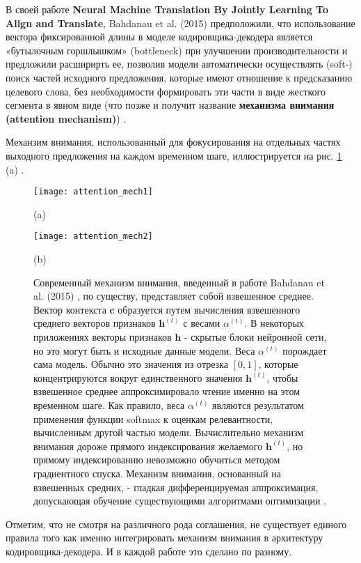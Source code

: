 В своей работе \textbf{Neural Machine Translation By Jointly Learning To 
Align and Translate}, Bahdanau et al. (2015) предположили, 
что использование вектора фиксированной длины в моделе кодировщика-декодера 
является «бутылочным горшлышком» (bottleneck) при улучшении производительности 
и предложили расширирть ее, позволив модели автоматически осуществлять (soft-) 
поиск частей исходного предложения, которые имеют отношение к предсказанию целевого 
слова, без необходимости формировать эти части в виде жесткого сегмента в явном виде 
(что позже и получит название \textbf{механизма внимания (attention mechanism)})
\cite{attention_mech}.

Механзим внимания, использованный для фокусирования на отдельных частях выходного 
предложения на каждом временном шаге, иллюстрируется на рис. \ref{fig:attention_mechs} (a) 
\cite{Goodfellow-et-al-2016}.

\newpage

\begin{figure}[htbp]
    \centering
    \begin{minipage}{0.35\textwidth}
        \texttt{[image: attention\_mech1]}
        \caption*{(a)}
        \label{fig:attention_mech1}
    \end{minipage}
    \hspace{30pt}
    \begin{minipage}{0.55\textwidth}
        \texttt{[image: attention\_mech2]}
        \caption*{(b)}
        \label{fig:attention_mech2}
    \end{minipage}
    \caption{Современный механизм внимания, введенный в работе
    Bahdanau et al. (2015) \cite{attention_mech}, 
    по существу, представляет собой взвешенное
    среднее. Вектор контекста $\bm{c}$ образуется путем вычисления взвешенного
    среднего векторов признаков $\bm{h}^{(t)}$ с весами $\alpha^{(t)}$. 
    В некоторых приложениях
    векторы признаков $\bm{h}$ - скрытые блоки нейронной сети, но это могут быть
    и исходные данные модели. Веса $\alpha^{(t)}$ порождает сама модель. Обычно это
    значения из отрезка $[0, 1]$, которые концентрируются вокруг единственного
    значения $\bm{h}^{(t)}$, чтобы взвешенное среднее аппроксимировало чтение 
    именно на этом временном шаге. Как правило, веса $\alpha^{(t)}$ являются результатом
    применения функции softmax к оценкам релевантности, вычисленным другой 
    частью модели. Вычислительно механизм внимания дороже прямого
    индексирования желаемого $\bm{h}^{(t)}$, но прямому индексированию невозможно
    обучиться методом градиентного спуска. Механизм внимания, основанный
    на взвешенных средних, - гладкая дифференцируемая аппроксимация, допускающая 
    обучение существующими алгоритмами оптимизации \cite{Goodfellow-et-al-2016}.}
    \label{fig:attention_mechs}
\end{figure}

Отметим, что не смотря на различного рода соглашения, не существует единого правила 
того как именно интегрировать механизм внимания в архитектуру кодировщика-декодера. 
И в каждой работе это сделано по разному.

